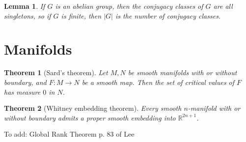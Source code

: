 \documentclass{article}
\newtheorem*{theorem}{Theorem}
\newtheorem*{lemma}{Lemma}
\begin{document}
\begin{lemma}
	If $G$ is an abelian group, then the conjugacy classes of $G$ are all singletons, so if $G$ is finite, then $|G|$ is the number of conjugacy classes.
\end{lemma}

\section{Manifolds}

\begin{theorem}[Sard's theorem]
	Let $M, N$ be smooth manifolds with or without boundary, and $F: M \rightarrow N$ be a smooth map. Then the set of critical values of $F$ has measure $0$ in $N$.
\end{theorem}

\begin{theorem}[Whitney embedding theorem]
	Every smooth $n$-manifold with or without boundary admits a proper smooth embedding into $\mathbb{R}^{2n+1}$.
\end{theorem}


To add:
Global Rank Theorem p. 83 of Lee
\end{document}
